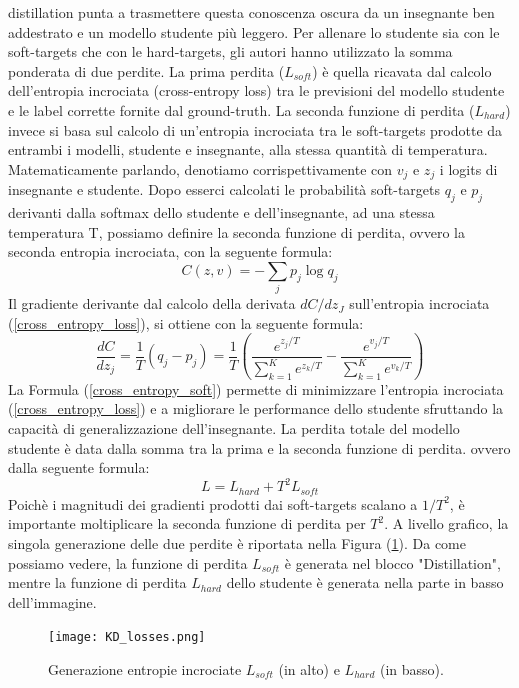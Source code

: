 distillation punta a trasmettere questa conoscenza oscura da un insegnante 
ben addestrato e un modello studente più leggero. Per allenare lo studente 
sia con le soft-targets che con le hard-targets, gli autori hanno utilizzato la 
somma ponderata di due perdite. La prima perdita ($L_{soft}$) è quella ricavata 
dal calcolo dell'entropia incrociata (cross-entropy loss) tra le previsioni del 
modello studente e le label corrette fornite dal ground-truth. La seconda 
funzione di perdita ($L_{hard}$) invece si basa sul calcolo di un'entropia incrociata 
tra le soft-targets prodotte da entrambi i modelli, studente e insegnante, 
alla stessa quantità di temperatura. Matematicamente parlando, denotiamo 
corrispettivamente con $v_j$ e $z_j$ i logits di insegnante e studente. Dopo esserci 
calcolati le probabilità soft-targets $q_j$ e $p_j$ derivanti dalla softmax dello 
studente e dell'insegnante, ad una stessa temperatura T, possiamo definire 
la seconda funzione di perdita, ovvero la seconda entropia incrociata, con la 
seguente formula:
\begin{equation}\label{cross_entropy_loss}
    C(z,v) = -\sum_jp_j \log{q_j}
\end{equation}
Il gradiente derivante dal calcolo della derivata $dC/dz_J$ sull'entropia incrociata 
(\ref{cross_entropy_loss}), si ottiene con la seguente formula:
\begin{equation}\label{cross_entropy_soft}
    \frac{dC}{dz_j}=\frac{1}{T}(q_j-p_j)=\frac{1}{T}\left(\frac{e^{z_j/T}}{\sum_{k=1}^K e^{z_k/T}}-\frac{e^{v_j/T}}{\sum_{k=1}^K e^{v_k/T}}\right)
\end{equation}
La Formula (\ref{cross_entropy_soft}) permette di minimizzare l'entropia incrociata (\ref{cross_entropy_loss}) 
e a migliorare le performance dello studente sfruttando la capacità di 
generalizzazione dell'insegnante. La perdita totale del modello studente è 
data dalla somma tra la prima e la seconda funzione di perdita. ovvero 
dalla seguente formula:
\begin{equation}
    L= L_{hard}+T^2L_{soft}
\end{equation}
Poichè i magnitudi dei gradienti prodotti dai soft-targets scalano a $1/T^2$, 
è importante moltiplicare la seconda funzione di perdita per $T^2$. A livello 
grafico, la singola generazione delle due perdite è riportata nella Figura 
(\ref{l_hard_soft}). Da come possiamo vedere, la funzione di perdita $L_{soft}$ è generata 
nel blocco "Distillation", mentre la funzione di perdita $L_{hard}$ dello studente 
è generata nella parte in basso dell'immagine.
\begin{figure}
    \centering
    \texttt{[image: KD\_losses.png]}
    \centering
    \caption{Generazione entropie incrociate $L_{soft}$ (in alto) e $L_{hard}$ (in basso).}
    \label{l_hard_soft}
\end{figure}